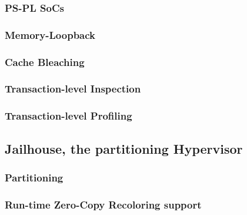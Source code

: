 \subsubsection{PS-PL SoCs}
\subsubsection{Memory-Loopback}
\subsubsection{Cache Bleaching}
\subsubsection{Transaction-level Inspection}
\subsubsection{Transaction-level Profiling}

\subsection{Jailhouse, the partitioning Hypervisor}
\subsubsection{Partitioning}
        \subsubsection{Run-time Zero-Copy Recoloring support}

